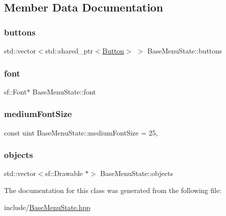 \subsection{Member Data Documentation}
\mbox{\label{class_base_menu_state_ab63cc442453d06b70372d627ceaf8a8e}} 
\subsubsection{\texorpdfstring{buttons}{buttons}}
{\footnotesize\ttfamily std\+::vector$<$std\+::shared\+\_\+ptr$<$\mbox{\hyperlink{class_button}{Button}}$>$ $>$ Base\+Menu\+State\+::buttons\hspace{0.3cm}{\ttfamily [protected]}}

\mbox{\label{class_base_menu_state_a2759c3ca4cfd0f34175846e295e0f4e9}} 
\subsubsection{\texorpdfstring{font}{font}}
{\footnotesize\ttfamily sf\+::\+Font$\ast$ Base\+Menu\+State\+::font\hspace{0.3cm}{\ttfamily [protected]}}

\mbox{\label{class_base_menu_state_a003cf33aa9c69fa85db7486f6812b4f6}} 
\subsubsection{\texorpdfstring{mediumFontSize}{mediumFontSize}}
{\footnotesize\ttfamily const uint Base\+Menu\+State\+::medium\+Font\+Size = 25\hspace{0.3cm}{\ttfamily [static]}, {\ttfamily [protected]}}

\mbox{\label{class_base_menu_state_ada76393153459237e15591fb244ab5ff}} 
\subsubsection{\texorpdfstring{objects}{objects}}
{\footnotesize\ttfamily std\+::vector$<$sf\+::\+Drawable $\ast$$>$ Base\+Menu\+State\+::objects\hspace{0.3cm}{\ttfamily [protected]}}



The documentation for this class was generated from the following file\+:\begin{DoxyCompactItemize}
\item 
include/\mbox{\hyperlink{_base_menu_state_8hpp}{Base\+Menu\+State.\+hpp}}\end{DoxyCompactItemize}
